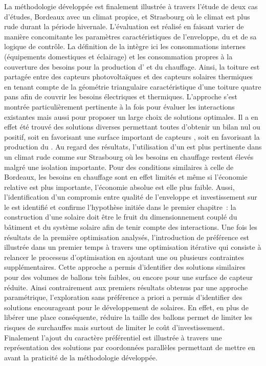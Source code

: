 La méthodologie développée est finalement illustrée à travers l’étude de deux cas
d’études, Bordeaux avec un climat propice, et Strasbourg où le climat est plus rude durant
la période hivernale. L’évaluation est réalisé en faisant varier de manière concomitante
les paramètres caractéristiques de l’enveloppe, du  et de sa logique de contrôle.
La définition de la  intègre ici les consommations internes (équipements
domestiques et éclairage) et les consommation propres à la couverture des besoins pour la
production d’ et du chauffage. Ainsi, la toiture est partagée entre des capteurs
photovoltaïques et des capteurs solaires thermiques en tenant compte de la géométrie
triangulaire caractéristique d’une toiture quatre pans afin de couvrir les besoins
électriques et thermiques.
L’approche s’est montrée particulièrement pertinente à la fois pour évaluer
les interactions existantes mais aussi pour proposer un large choix de solutions
optimales. Il a en effet été trouvé des solutions diverses permettant toutes d’obtenir un
bilan nul ou positif, soit en favorisant une surface important de capteurs , soit
en favorisant la production du . Au regard des résultats, l’utilisation d’un
 est plus pertinente dans un climat rude comme sur Strasbourg où les besoins en chauffage restent
élevés malgré une isolation importante. Pour des conditions
similaires à celle de Bordeaux, les besoins en chauffage sont en effet limités et même si
l’économie relative est plus importante, l’économie absolue est elle plus faible. Aussi,
l’identification d’un compromis entre qualité de l’enveloppe et investissement sur le
 est identifié et confirme l’hypothèse initiée dans le premier chapitre~: la
construction d’une  solaire doit être le fruit du dimensionnement couplé du
bâtiment et du système solaire afin de tenir compte des interactions. Une fois les
résultats de la première optimisation analysés, l’introduction
de préférence est illustrée dans un premier temps à travers une optimisation itérative qui
consiste à relancer le processus d’optimisation en ajoutant une ou plusieurs contraintes
supplémentaires. Cette approche a permis d’identifier des solutions similaires pour des
volumes de ballons très faibles, ou encore pour une surface de capteur réduite. Ainsi
contrairement aux premiers résultats obtenus par une approche paramétrique, l’exploration
sans préférence a priori a permis d’identifier des solutions encourageant pour le
développement de  solaires. En effet, en plus de libérer une place conséquente,
réduire la taille des ballons permet de limiter les risques de surchauffes mais surtout de
limiter le coût d’investissement. Finalement l’ajout du caractère préférentiel est illustrée à travers
une représentation des solutions par coordonnées parallèles permettant de mettre en avant
la praticité de la méthodologie développée.


